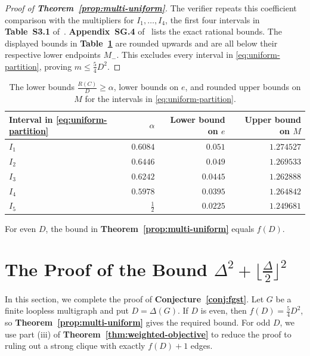 \documentclass[preprint,11pt,numbers]{elsarticle-arxiv}
\numberwithin{equation}{section}
\theoremstyle{definition}
\newenvironment{lateproof}[1]{\begin{proof}[Proof of #1]}{\end{proof}}
\begin{document}
\begin{lateproof}{\textbf{Theorem~\ref{prop:multi-uniform}}}
The verifier  repeats this
coefficient comparison with the multipliers for $I_1,\ldots,I_4$,
the first four intervals in \textbf{Table~S3.1} of~\cite{FGSTSupplement}.
\textbf{Appendix~SG.4} of~\cite{FGSTSupplement}
lists the exact rational bounds. The displayed bounds in
\textbf{Table~\ref{tab:main-uniform-intervals}} are rounded upwards and
are all below their respective lower endpoints $M_-$. This
excludes every interval in \eqref{eq:uniform-partition}, proving
$m\leq\frac54D^2$.
\end{lateproof}

\begin{table}[htbp]
\centering
\begin{tabular}{@{}lrrr@{}}
\toprule
Interval in \eqref{eq:uniform-partition} & $\alpha$ & Lower bound on $e$ & Upper bound on $M$\\
\midrule
$I_1$ & $0.6084$ & $0.051$ & $1.274527$\\
$I_2$ & $0.6446$ & $0.049$ & $1.269533$\\
$I_3$ & $0.6242$ & $0.0445$ & $1.262888$\\
$I_4$ & $0.5978$ & $0.0395$ & $1.264842$\\
$I_5$ & $\frac{1}{2}$ & $0.0225$ & $1.249681$\\
\bottomrule
\end{tabular}
\caption{The lower bounds $\frac{R(C)}{D}\geq\alpha$, lower bounds
on $e$, and rounded upper bounds on $M$ for the intervals in
\eqref{eq:uniform-partition}.}
\label{tab:main-uniform-intervals}
\end{table}

For even $D$, the bound in \textbf{Theorem~\ref{prop:multi-uniform}}
equals $f(D)$.

\section{The Proof of the Bound \texorpdfstring{$\Delta^2+\lfloor\frac{\Delta}{2}\rfloor^2$}{Delta squared plus floor(Delta/2) squared}}
\label{sec:exact}\label{sec:multi-odd}

In this section, we complete the proof of \textbf{Conjecture~\ref{conj:fgst}}.
Let $G$ be a finite loopless multigraph and put $D=\Delta(G)$. If $D$ is
even, then $f(D)=\frac{5}{4}D^2$, so
\textbf{Theorem~\ref{prop:multi-uniform}} gives the required bound.
For odd $D$, we use part \textup{(iii)} of
\textbf{Theorem~\ref{thm:weighted-objective}} to reduce the proof to
ruling out a strong clique with exactly $f(D)+1$ edges.
\end{document}
